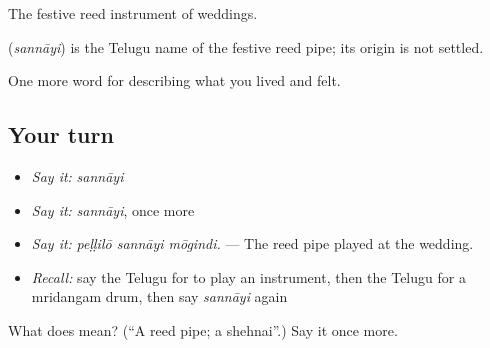 The festive reed instrument of weddings.

\begin{cousinweb}
\textbf{} (\emph{sannāyi}) is the Telugu name of the festive reed pipe; its origin is not settled.
\end{cousinweb}

\begin{grammarlens}[title={What you've built}]
One more word for describing what you lived and felt.
\end{grammarlens}

\subsection*{Your turn}
\begin{itemize}
\raggedright
  \item \emph{Say it:} \emph{sannāyi}
  \item \emph{Say it:} \emph{sannāyi}, once more
  \item \emph{Say it:} \emph{peḷḷilō sannāyi mōgindi.} — The reed pipe played at the wedding.
  \item \emph{Recall:} say the Telugu for to play an instrument, then the Telugu for a mridangam drum, then say \emph{sannāyi} again
\end{itemize}

\begin{tcolorbox}[breakable,colback=teal!4,colframe=teal!35!black,title={Before you move on}]
What does  mean? (\textquotedblleft{}A reed pipe; a shehnai\textquotedblright{}.) Say it once more.
\end{tcolorbox}
